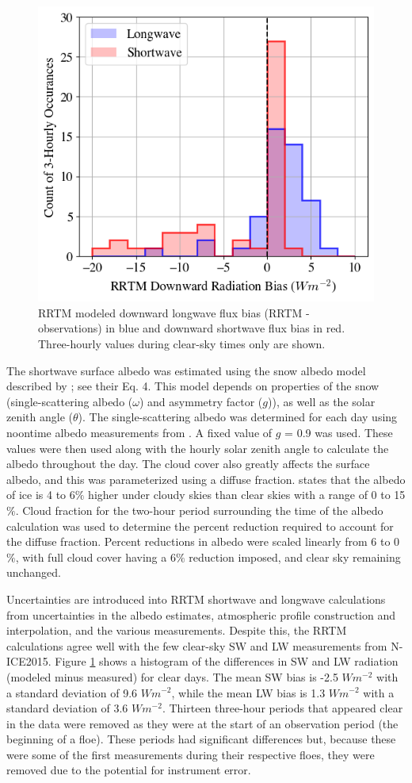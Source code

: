 \begin{figure}[b!]
    \centering
    \includegraphics[width=0.65\linewidth]{figures/chapter4/RRTMcorrelation_bias.png}
    \caption[RRTM modeled downward flux bias histogram.]{RRTM modeled downward longwave flux bias (RRTM - observations) in blue and downward shortwave flux bias in red. Three-hourly values during clear-sky times only are shown.}
    \label{fig:rrtm}
\end{figure}

The shortwave surface albedo was estimated using the snow albedo model described by \citet{wiscombe:1980}; see their Eq. 4. This model depends on properties of the snow (single-scattering albedo ($\omega$) and asymmetry factor ($g$)), as well as the solar zenith angle ($\theta$). The single-scattering albedo was determined for each day using noontime albedo measurements from \citet{walden:2017}. A fixed value of $g$ = 0.9 was used. These values were then used along with the hourly solar zenith angle to calculate the albedo throughout the day. The cloud cover also greatly affects the surface albedo, and this was parameterized using a diffuse fraction. \citet{key:2001} states that the albedo of ice is 4 to 6$\%$ higher under cloudy skies than clear skies with a range of 0 to 15$\%$. Cloud fraction for the two-hour period surrounding the time of the albedo calculation was used to determine the percent reduction required to account for the diffuse fraction. Percent reductions in albedo were scaled linearly from 6 to 0$\%$, with full cloud cover having a 6$\%$ reduction imposed, and clear sky remaining unchanged.

Uncertainties are introduced into RRTM shortwave and longwave calculations from uncertainties in the albedo estimates, atmospheric profile construction and interpolation, and the various measurements. Despite this, the RRTM calculations agree well with the few clear-sky SW and LW measurements from N-ICE2015. Figure \ref{fig:rrtm} shows a histogram of the differences in SW and LW radiation (modeled minus measured) for clear days. The mean SW bias is -2.5 $W m^{-2}$ with a standard deviation of 9.6 $W m^{-2}$, while the mean LW bias is 1.3 $W m^{-2}$ with a standard deviation of 3.6 $W m^{-2}$. Thirteen three-hour periods that appeared clear in the data were removed as they were at the start of an observation period (the beginning of a floe). These periods had significant differences but, because these were some of the first measurements during their respective floes, they were removed due to the potential for instrument error.

